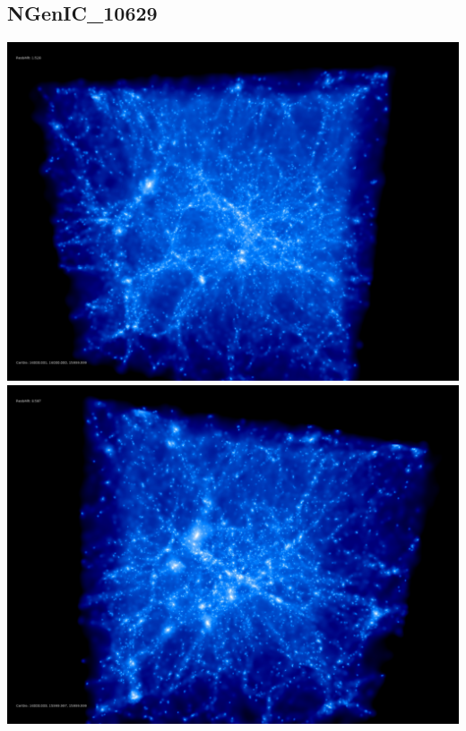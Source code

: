 % 
%
%
%
%
%
%
%


\newpage
\subsection{NGenIC\_10629}

\includegraphics[scale=0.1]{NGenIC_10629/50.jpg} 
\includegraphics[scale=0.1]{NGenIC_10629/100.jpg}  \\

